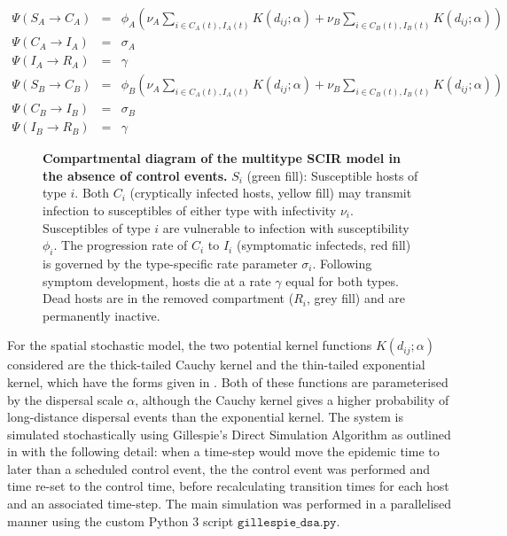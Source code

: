 \documentclass[11pt,letterpaper]{article}
\begin{document}
\label{twospecies}
    
\begin{eqnarray}    
\Psi \left( S_{A} \rightarrow C_{A}\right) &=& \phi_{A} \left( \nu_{A} \sum_{i \in C_{A}(t), I_{A}(t)}^{} K(d_{ij}; \alpha) + \nu_{B} \sum_{i \in C_{B}(t), I _{B}(t)}^{} K(d_{ij}; \alpha) \right) \\
   \Psi \left( C_{A} \rightarrow I_{A}\right)  &=&  \sigma_{A} \\
   \Psi \left(I_{A} \rightarrow R _{A}\right) &=& \gamma \\
    \Psi \left( S_{B} \rightarrow C_{B}\right) &=& \phi_{B} \left( \nu_{A} \sum_{i \in C_{A}(t), I_{A}(t)}^{} K(d_{ij}; \alpha) + \nu_{B} \sum_{i \in C_{B}(t), I _{B}(t)}^{} K(d_{ij}; \alpha) \right) \\
   \Psi \left( C_{B} \rightarrow I_{B}\right) &=&  \sigma_{B} \\
  \Psi \left(I_{B} \rightarrow R_{B}\right) &=& \gamma 
\end{eqnarray}



\begin{figure}[h]
	\centering
	
	\vspace*{5mm}
	\caption{ \label{compartmentdiag} \textbf{Compartmental diagram of the multitype SCIR model in the absence of control events.} $S_i$ (green fill): Susceptible hosts of type $i$. Both $C_i$ (cryptically infected hosts, yellow fill) may transmit infection to susceptibles of either type with infectivity $\nu_{i}$. Susceptibles of type $i$ are vulnerable to infection with susceptibility $\phi_{i}$. The progression rate of $C_{i}$ to $I_{i}$ (symptomatic infecteds, red fill) is governed by the type-specific rate parameter $\sigma_{i}$. Following symptom development, hosts die at a rate $\gamma$ equal for both types. Dead hosts are in the removed compartment ($R_{i}$, grey fill) and are permanently inactive.}
	\end{figure}


For the spatial stochastic model, the two potential kernel functions $K(d_{ij}; \alpha)$ considered are the thick-tailed Cauchy kernel and the thin-tailed exponential kernel, which have the forms given in \cite{HyattTwynam2017}. Both of these functions are parameterised by the dispersal scale $\alpha$, although the Cauchy kernel gives a higher probability of long-distance dispersal events than the exponential kernel.
The system is simulated stochastically using Gillespie's Direct Simulation Algorithm \cite{Gillespie1977} as outlined in \cite{Keeling2008} with the following detail: when a time-step would move the epidemic time to later than a scheduled control event, the the control event was performed and time re-set to the control time, before recalculating transition times for each host and an associated time-step. The main simulation was performed in a parallelised manner using the custom Python 3 script  $\texttt{gillespie\_dsa.py}$.
\end{document}
